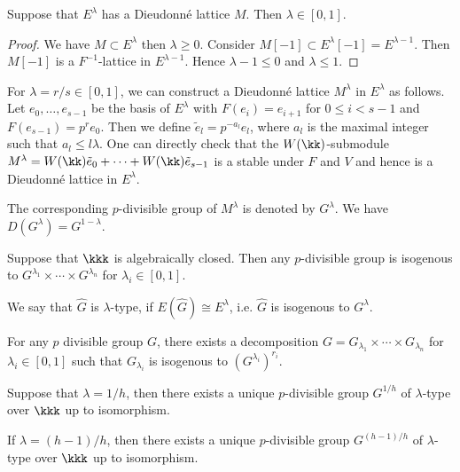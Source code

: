 \begin{corollary}
	Suppose that $E^\lambda$ has a Dieudonn\'e lattice $M$.
	Then $\lambda \in [0, 1]$.
\end{corollary}
\begin{proof}[Proof]
	We have $M \subset E^\lambda$ then $\lambda \geq 0$.
	Consider $M[-1] \subset E^\lambda[-1] = E^{\lambda - 1}$.
	Then $M[-1]$ is a $F^{-1}$-lattice in $E^{\lambda - 1}$.
	Hence $\lambda - 1 \leq 0$ and $\lambda \leq 1$.
\end{proof}

For $\lambda = r/s \in [0, 1]$, we can construct a Dieudonn\'e lattice $M^\lambda$ in $E^\lambda$ as follows.
Let $e_0, \ldots, e_{s-1}$ be the basis of $E^\lambda$ with $F(e_i) = e_{i+1}$ for $0 \leq i < s-1$ and $F(e_{s-1}) = p^r e_0$.
Then we define $\tilde{e}_l = p^{-a_l}e_l$, where $a_l$ is the maximal integer such that $a_l \leq l \lambda$.
One can directly check that the $W(\kk)$-submodule $M^\lambda = W(\kk) \tilde{e}_0 + \cdots + W(\kk) \tilde{e}_{s-1}$ is a stable under $F$ and $V$ and hence is a Dieudonn\'e lattice in $E^\lambda$.

The corresponding $p$-divisible group of $M^\lambda$ is denoted by $G^\lambda$.
We have $D(G^\lambda) = G^{1-\lambda}$.

\begin{proposition}
	Suppose that $\kkk$ is algebraically closed.
	Then any $p$-divisible group is isogenous to $G^{\lambda_1} \times \cdots \times G^{\lambda_n}$ for $\lambda_i \in [0,1]$.
\end{proposition}

We say that $\hat{G}$ is $\lambda$-type, if $E(\hat{G}) \cong E^\lambda$, i.e. $\hat{G}$ is isogenous to $G^\lambda$.


\begin{proposition}
	For any $p$ divisible group $G$, there exists a decomposition $G = G_{\lambda_1} \times \cdots \times G_{\lambda_n}$ for $\lambda_i \in [0, 1]$ such that $G_{\lambda_i}$ is isogenous to $(G^{\lambda_i})^{r_i}$.
\end{proposition}


\begin{proposition}
	Suppose that $\lambda = 1/h$, then there exists a unique $p$-divisible group $G^{1/h}$ of $\lambda$-type over $\kkk$ up to isomorphism.
\end{proposition}

\begin{corollary}
	If $\lambda = (h-1)/h$, then there exists a unique $p$-divisible group $G^{(h-1)/h}$ of $\lambda$-type over $\kkk$ up to isomorphism.
\end{corollary}


